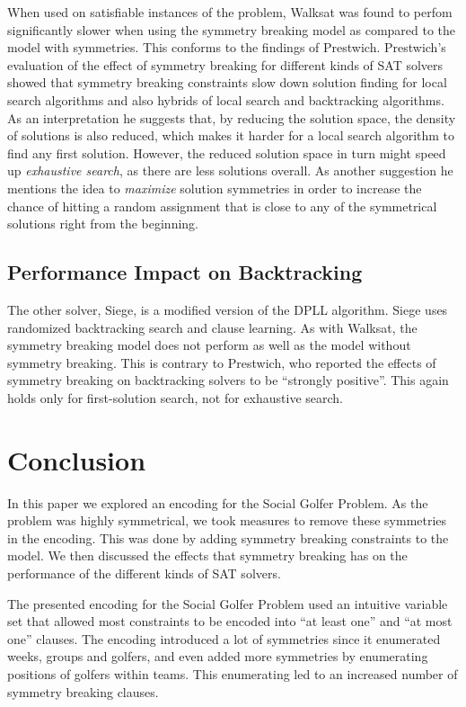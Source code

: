 \documentclass[a4paper]{scrartcl}
\begin{document}
When used on satisfiable instances of the problem, Walksat was found to perfom significantly slower when using the symmetry breaking model as compared to the model with symmetries. This conforms to the findings of Prestwich\cite{Prestwich}. Prestwich's evaluation of the effect of symmetry breaking for different kinds of SAT solvers showed that symmetry breaking constraints slow down solution finding for local search algorithms and also hybrids of local search and backtracking algorithms. As an interpretation he suggests that, by reducing the solution space, the density of solutions is also reduced, which makes it harder for a local search algorithm to find any first solution. However, the reduced solution space in turn might speed up \emph{exhaustive search}, as there are less solutions overall. As another suggestion he mentions the idea to \emph{maximize} solution symmetries in order to increase the chance of hitting a random assignment that is close to any of the symmetrical solutions right from the beginning.


\subsection{Performance Impact on Backtracking}

The other solver, Siege, is a modified version of the DPLL algorithm\cite{DPLL}. Siege uses randomized backtracking search and clause learning. As with Walksat, the symmetry breaking model does not perform as well as the model without symmetry breaking. This is contrary to Prestwich, who reported the effects of symmetry breaking on backtracking solvers to be ``strongly positive''. This again holds only for first-solution search, not for exhaustive search.


\section{Conclusion}

In this paper we explored an encoding for the Social Golfer Problem. As the problem was highly symmetrical, we took measures to remove these symmetries in the encoding. This was done by adding symmetry breaking constraints to the model. We then discussed the effects that symmetry breaking has on the performance of the different kinds of SAT solvers.

The presented encoding for the Social Golfer Problem used an intuitive variable set that allowed most constraints to be encoded into ``at least one'' and ``at most one'' clauses. The encoding introduced a lot of symmetries since it enumerated weeks, groups and golfers, and even added more symmetries by enumerating positions of golfers within teams. This enumerating led to an increased number of symmetry breaking clauses.
\end{document}
